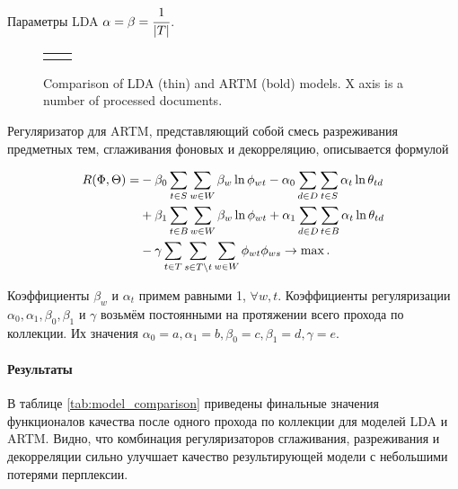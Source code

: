 \documentclass{article}
\begin{document}
Параметры LDA $\alpha = \beta = \cfrac{1}{|T|}$.

\begin{figure}[h!]
\begin{tabular}{cc}

&

\end{tabular}
\caption{Comparison of LDA (thin) and ARTM (bold) models. X axis is a number of processed documents.} \label{fig:comparison_1}
\end{figure}

Регуляризатор для ARTM, представляющий собой смесь разреживания предметных тем, сглаживания фоновых и декорреляцию, описывается формулой

\begin{align}
    R(\Phi,\Theta)
    =&
    - \beta_0 \sum_{t\in S} \sum_{w\in W} \beta_w \ln \phi_{wt}
    - \alpha_0 \sum_{d\in D} \sum_{t\in S} \alpha_t \ln \theta_{td}
    \notag
\\  {}&
    + \beta_1 \sum_{t\in B} \sum_{w\in W} \beta_w \ln \phi_{wt}
    + \alpha_1 \sum_{d\in D} \sum_{t\in B} \alpha_t \ln \theta_{td}
    \notag
\\  {}&
    - \gamma
        \sum_{t\in T}
        \sum_{s\in T\backslash t}
        \sum_{w\in W} \phi_{wt}\phi_{ws}
    \to \max.
\end{align}

Коэффициенты $\beta_w$ и $\alpha_t$ примем равными 1, $\forall w,t$. Коэффициенты регуляризации $\alpha_0, \alpha_1, \beta_0, \beta_1$ и $\gamma$ возьмём постоянными на протяжении всего прохода по коллекции. Их значения $\alpha_0 = a, \alpha_1 = b, \beta_0 = c, \beta_1 = d, \gamma = e$.

\paragraph{Результаты} В таблице \ref{tab:model_comparison} приведены финальные значения функционалов качества после одного прохода по коллекции для моделей LDA и ARTM. Видно, что комбинация регуляризаторов сглаживания, разреживания и декорреляции сильно улучшает качество результирующей модели с небольшими потерями перплексии.
\end{document}

